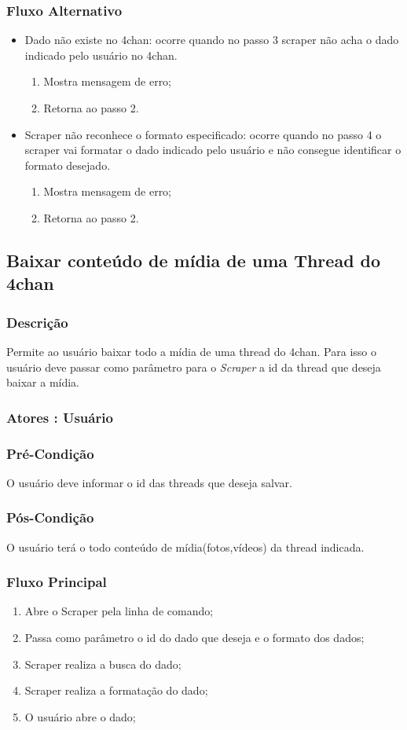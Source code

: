 \subsubsection{Fluxo Alternativo}
\begin{itemize}
    \item Dado não existe no 4chan: ocorre quando no passo 3 scraper não acha o dado indicado pelo usuário no 4chan.
    \begin{enumerate}
        \item Mostra mensagem de erro;
        \item Retorna ao passo 2.
    \end{enumerate}
    \item Scraper não reconhece o formato especificado: ocorre quando no passo 4 o scraper vai formatar o dado indicado pelo usuário e não consegue identificar o formato desejado.
    \begin{enumerate}
        \item Mostra mensagem de erro;
        \item Retorna ao passo 2.
    \end{enumerate}
\end{itemize}

\subsection{Baixar conteúdo de mídia de uma Thread do 4chan}
\subsubsection{Descrição}
Permite ao usuário baixar todo a mídia de uma thread do 4chan. Para isso o usuário deve passar como parâmetro para o \textit{Scraper} a id da thread que deseja baixar a mídia.
\subsubsection{Atores : Usuário}
\subsubsection{Pré-Condição}
O usuário deve informar o id das threads que deseja salvar.
\subsubsection{Pós-Condição}
O usuário terá o todo conteúdo de mídia(fotos,vídeos) da thread indicada.
\subsubsection{Fluxo Principal}
\begin{enumerate}
    \item Abre o Scraper pela linha de comando;
    \item Passa como parâmetro o id do dado que deseja e o formato dos dados;
    \item Scraper realiza a busca do dado;
    \item Scraper realiza a formatação do dado;
    \item O usuário abre o dado;
\end{enumerate}
